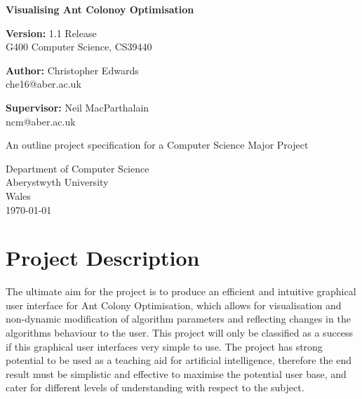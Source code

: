 \documentclass[10pt,a4paper]{article}
\begin{document}
\begin{titlepage}
    \begin{center}
        \vspace{1cm}
        
        \Huge
        \textbf{Visualising Ant Colonoy Optimisation}
                
	 \vspace{0.5cm}
        \Large
	 \textbf{Version:} 1.1 Release \\
        G400  Computer Science, CS39440
	  

        \vspace{1.0cm}
        
	  \Large
        \textbf{Author:} Christopher Edwards \\
         che16@aber.ac.uk

 	  \vspace{0.8cm}
 	  \textbf{Supervisor:} Neil MacParthalain \\
         ncm@aber.ac.uk
        
        \vspace{3.0cm}
        
        An outline project specification for a Computer Science Major Project
                
        \vspace{0.8cm}
                
        \Large
        Department of Computer Science\\
        Aberystwyth University\\
        Wales\\
        \today
        
	\end{center}
\end{titlepage}

\section{Project Description}

The ultimate aim for the project is to produce an efficient and intuitive graphical user interface for Ant Colony Optimisation, which allows for visualisation and non-dynamic modification of algorithm parameters and reflecting changes in the algorithms behaviour to the user. This project will only be classified as a success if this graphical user interfaces very simple to use. The project has strong potential to be used as a teaching aid for artificial intelligence, therefore the end result must be simplistic and effective to maximise the potential user base, and cater for different levels of understanding with respect to the subject. 
\end{document}
